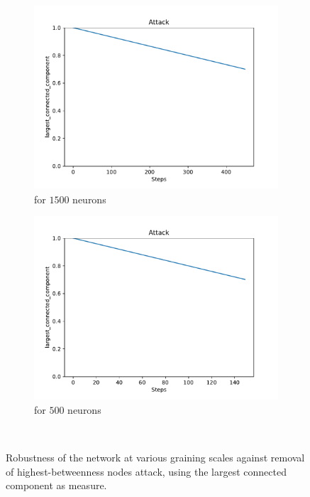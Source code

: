 \begin{figure}
\begin{subfigure}[b]{0.45\textwidth}
		\includegraphics[width=\textwidth]{Images/plots_ib/ib_38.pdf}
		\caption{for $1500$ neurons}
	\end{subfigure}
	\hfill
	\begin{subfigure}[b]{0.45\textwidth}
		\centering
		\includegraphics[width=\textwidth]{Images/plots_ib/ib_40.pdf}
		\caption{for $500$ neurons}
	\end{subfigure}
	\\ \vspace{5mm}
	
	
	\caption{Robustness of the network at various graining scales against removal of highest-betweenness nodes attack, using the largest connected component as measure.}
	\label{fig:ib_atk}
\end{figure}


